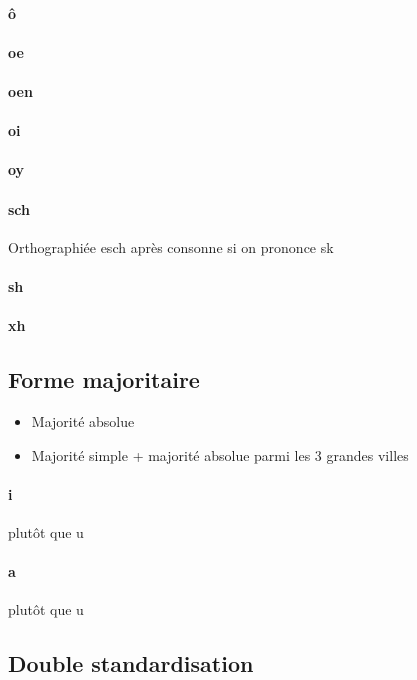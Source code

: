 \documentclass[french]{article}
\begin{document}
\paragraph{ô}
\paragraph{oe}
\paragraph{oen}
\paragraph{oi}
\paragraph{oy}
\paragraph{sch}
Orthographiée esch après consonne si on prononce sk
\paragraph{sh}
\paragraph{xh}

\subsection{Forme majoritaire}

\begin{itemize}
	\item Majorité absolue
	\item Majorité simple + majorité absolue parmi les 3 grandes villes
\end{itemize}

\paragraph{i} plutôt que u
\paragraph{a} plutôt que u

\subsection{Double standardisation}
\end{document}

